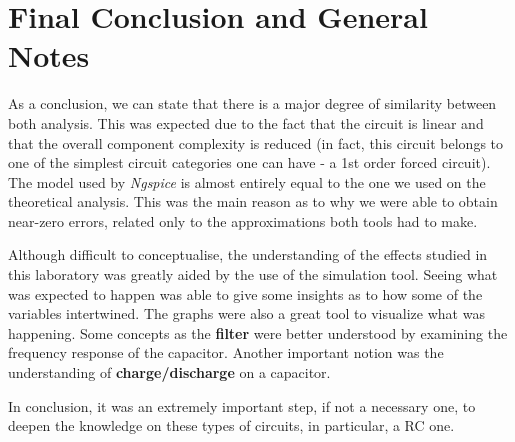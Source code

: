 \section{Final Conclusion and General Notes}
\label{sec:conclusion}

As a conclusion, we can state that there is a major degree of similarity between both analysis. This was expected due to the fact that the circuit is linear and that the overall component complexity is reduced (in fact, this circuit belongs to one of the simplest circuit categories one can have - a 1st order forced circuit). The model used by \textit{Ngspice} is almost entirely equal to the one we used on the theoretical analysis. This was the main reason as to why we were able to obtain near-zero errors, related only to the approximations both tools had to make.

Although difficult to conceptualise, the understanding of the effects studied in this laboratory was greatly aided by the use of the simulation tool. Seeing what was expected to happen was able to give some insights as to how some of the variables intertwined. The graphs were also a great tool to visualize what was happening. Some concepts as the \textbf{filter} were better understood by examining the frequency response of the capacitor. Another important notion was the understanding of \textbf{charge/discharge} on a capacitor.

In conclusion, it was an extremely important step, if not a necessary one, to deepen the knowledge on these types of circuits, in particular, a RC one.
